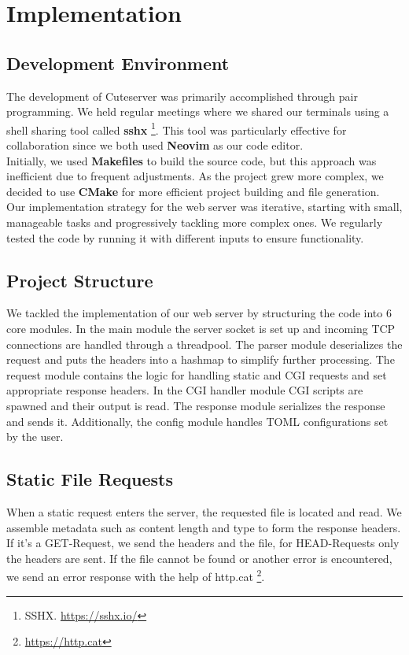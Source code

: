 \section*{Implementation}

\subsection*{Development Environment} 
The development of Cuteserver was primarily accomplished through pair programming. We held regular meetings where we shared our terminals using a shell sharing tool called \textbf{sshx} \footnote{SSHX. \url{https://sshx.io/}}. This tool was particularly effective for collaboration since we both used \textbf{Neovim} as our code editor. \\
 
Initially, we used \textbf{Makefiles} to build the source code, but this approach was inefficient due to frequent adjustments. As the project grew more complex, we decided to use \textbf{CMake} for more efficient project building and file generation. \\

Our implementation strategy for the web server was iterative, starting with small, manageable tasks and progressively tackling more complex ones. We regularly tested the code by running it with different inputs to ensure functionality.

\subsection*{Project Structure} 
We tackled the implementation of our web server by structuring the code into 6 core modules. In the main module the server socket is set up and incoming TCP connections are handled through a threadpool. The parser module deserializes the request and puts the headers into a hashmap to simplify further processing. The request module contains the logic for handling static and CGI requests and set appropriate response headers. In the CGI handler module CGI scripts are spawned and their output is read. The response module serializes the response and sends it. Additionally, the config module handles TOML configurations set by the user. 

\subsection*{Static File Requests}
When a static request enters the server, the requested file is located and read. We assemble metadata such as content length and type to form the response headers. If it's a GET-Request, we send the headers and the file, for HEAD-Requests only the headers are sent. If the file cannot be found or another error is encountered, we send an error response with the help of http.cat \footnote{\url{https://http.cat}}. 

